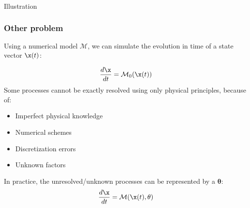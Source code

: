 \documentclass[handout]{beamer}
\newcommand{\btheta}{\mathbf{\theta}}
\newcommand{\M}{\mathcal{M}}
\begin{document}
\begin{frame}{Illustration}
\begin{figure}
\end{figure}
\end{frame}
\begin{frame}
\frametitle{Other problem}
Using a numerical model $\M$, we can simulate
 the evolution in time of a state vector $\x(t)$:

\begin{equation*}
\frac{d\x}{dt} = \M_0(\x(t))
\end{equation*}
Some processes cannot be exactly resolved using only physical
principles, because of:
\begin{itemize}
\item Imperfect physical knowledge
\item Numerical schemes
\item Discretization errors
\item Unknown factors
\end{itemize}
In practice, the unresolved/unknown processes can be represented by a 
$\btheta$:
\begin{equation*}
\frac{d\x}{dt} = \M(\x(t),\btheta)
\end{equation*}
\end{frame}
\end{document}
